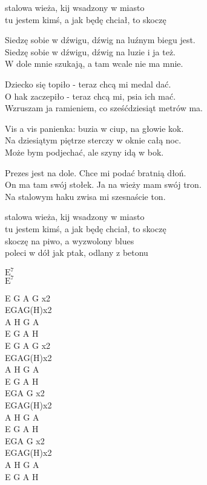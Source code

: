 \begin{text}
    stalowa wieża, kij wsadzony w miasto\\
    tu jestem kimś, a jak będę chciał, to skoczę

    Siedzę sobie w dźwigu, dźwig na luźnym biegu jest.\\
    Siedzę sobie w dźwigu, dźwig na luzie i ja też.\\
    W dole mnie szukają, a tam wcale nie ma mnie.

    Dziecko się topiło - teraz chcą mi medal dać.\\
    O hak zaczepiło - teraz chcą mi, psia ich mać.\\
    Wzruszam ja ramieniem, co sześćdziesiąt metrów ma.

    Vis a vis panienka: buzia w ciup, na głowie kok.\\
    Na dziesiątym piętrze sterczy w oknie całą noc.\\
    Może bym podjechać, ale szyny idą w bok.

    Prezes jest na dole. Chce mi podać bratnią dłoń.\\
    On ma tam swój stołek. Ja na wieży mam swój tron.\\
    Na stalowym haku zwisa mi szesnaście ton.

    stalowa wieża, kij wsadzony w miasto\\
    tu jestem kimś, a jak będę chciał, to skoczę\\
    skoczę na piwo, a wyzwolony blues\\
    poleci w dół jak ptak, odlany z betonu
\end{text}
\begin{chord}
    $\mathrm{E^7}$\\
    $\mathrm{E^7}$

    E G A G x2\\
    EGAG(H)x2\\
    A H G A\\
    E G A H\\
    E G A G x2\\
    EGAG(H)x2\\
    A H G A\\
    E G A H\\
    EGA G x2\\
    EGAG(H)x2\\
    A H G A\\
    E G A H\\
    EGA G x2\\
    EGAG(H)x2\\
    A H G A\\
    E G A H
\end{chord}

